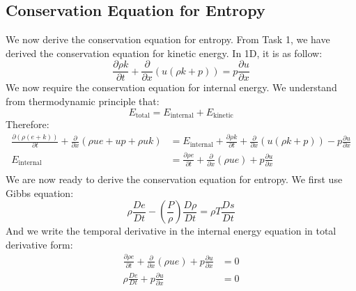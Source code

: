 \documentclass[a4paper]{article}
\numberwithin{equation}{section}
\begin{document}
\subsection{Conservation Equation for Entropy}
We now derive the conservation equation for entropy. From Task 1, we have derived the conservation equation for kinetic energy. In 1D, it is as follow:
\begin{equation}
    \frac{\partial \rho k}{\partial t} + \frac{\partial}{\partial x}(u(\rho k + p)) = p \frac{\partial u}{\partial x}
\end{equation}
We now require the conservation equation for internal energy. We understand from thermodynamic principle that:
\begin{equation}
    E_{\text{total}} = E_{\text{internal}} + E_{\text{kinetic}}
\end{equation}
Therefore:
\begin{equation}
    \begin{split}
        \frac{\partial (\rho(e + k))}{\partial t} + \frac{\partial}{\partial x} \left(\rho u e + up + \rho u k\right) &=  E_{\text{internal}} +     \frac{\partial \rho k}{\partial t} + \frac{\partial}{\partial x}(u(\rho k + p)) - p \frac{\partial u}{\partial x}\\
        E_{\text{internal}} &= \frac{\partial \rho e}{\partial t} + \frac{\partial}{\partial x}(\rho u e) + p \frac{\partial u}{\partial x}\\
    \end{split}
\end{equation}
We are now ready to derive the conservation equation for entropy. We first use Gibbs equation:
\begin{equation}\label{eq:GibbsEquation}
    \rho \frac{D e}{Dt} - \left(\frac
    {P}{\rho}\right) \frac{D \rho}{D t} = \rho T \frac{D s}{D t}
\end{equation}
And we write the temporal derivative in the internal energy equation in total derivative form:
\begin{equation} \label{eq:internalEnergy}
    \begin{split}
        \frac{\partial \rho e}{\partial t} + \frac{\partial}{\partial x}(\rho u e) + p \frac{\partial u}{\partial x} &= 0\\
        \rho \frac{D e}{D t} + p \frac{\partial u}{\partial x} &= 0\\
    \end{split}
\end{equation}
\end{document}
